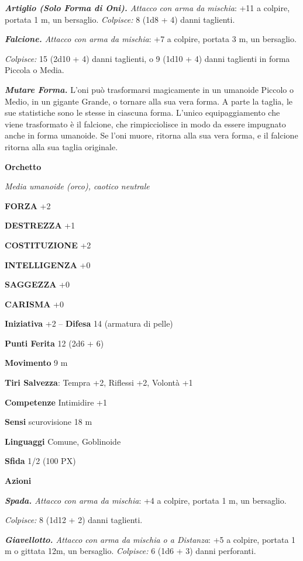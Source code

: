 \begin{multicols}{2}
\textit{\textbf{Artiglio (Solo Forma di Oni).} Attacco con arma da mischia}: +11 a colpire, portata 1 m, un bersaglio. \textit{Colpisce:} 8 (1d8 + 4) danni taglienti.

\textit{\textbf{Falcione.} Attacco con arma da mischia}: +7 a colpire, portata 3 m, un bersaglio.

\textit{Colpisce:} 15 (2d10 + 4) danni taglienti, o 9 (1d10 + 4) danni taglienti in forma Piccola o Media.

\textit{\textbf{Mutare Forma.}} L'oni può trasformarsi magicamente in un umanoide Piccolo o Medio, in un gigante Grande, o tornare alla sua vera forma. A parte la taglia, le sue statistiche sono le stesse in ciascuna forma. L'unico equipaggiamento che viene trasformato è il falcione, che rimpicciolisce in modo da essere impugnato anche in forma umanoide. Se l'oni muore, ritorna alla sua vera forma, e il falcione ritorna alla sua taglia originale.

\medskip{}\textbf{Orchetto}

\textit{Media umanoide (orco), caotico neutrale}

\textbf{FORZA} +2

\textbf{DESTREZZA} +1

\textbf{COSTITUZIONE} +2

\textbf{INTELLIGENZA} +0

\textbf{SAGGEZZA} +0

\textbf{CARISMA} +0

\textbf{Iniziativa} +2 -- \textbf{Difesa} 14 (armatura di pelle)

\textbf{Punti Ferita} 12 (2d6 + 6)

\textbf{Movimento} 9 m

\textbf{Tiri Salvezza}: Tempra +2, Riflessi +2, Volontà +1

\textbf{Competenze} Intimidire +1

\textbf{Sensi} scurovisione 18 m

\textbf{Linguaggi} Comune, Goblinoide

\textbf{Sfida} 1/2 (100 PX)

\textbf{Azioni}

\textit{\textbf{Spada.} Attacco con arma da mischia}: +4 a colpire, portata 1 m, un bersaglio.

\textit{Colpisce:} 8 (1d12 + 2) danni taglienti.

\textit{\textbf{Giavellotto.} Attacco con arma da mischia o a Distanza}: +5 a colpire, portata 1 m o gittata 12m, un bersaglio. \textit{Colpisce:} 6 (1d6 + 3) danni perforanti.


\end{multicols}
